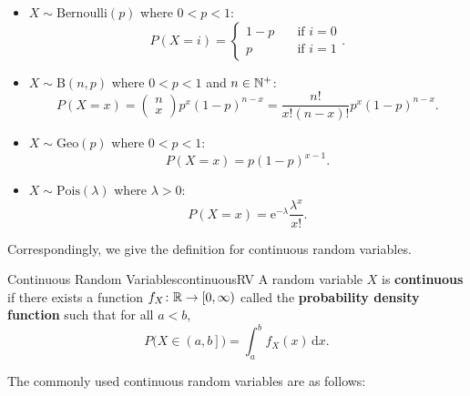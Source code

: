 \documentclass[math, code]{amznotes}
\theoremstyle{remark}
\newcommand{\e}{\mathrm{e}}
\renewcommand{\d}{\mathrm{d}}
\begin{document}
\begin{itemize}
    \item $X \sim \mathrm{Bernoulli}\left(p\right)$ where $0 < p < 1$:
    \begin{equation*}
        P\left(X = i\right) = \begin{cases}
            1 - p & \quad\textrm{if } i = 0 \\
            p & \quad\textrm{if } i = 1
        \end{cases}.
    \end{equation*}
    \item $X \sim \mathrm{B}\left(n, p\right)$ where $0 < p < 1$ and $n \in \mathbb{N}^+$:
    \begin{equation*}
        P\left(X = x\right) = \begin{pmatrix}
            n \\
            x
        \end{pmatrix}p^x\left(1 - p\right)^{n - x} = \frac{n!}{x!\left(n - x\right)!}p^x\left(1 - p\right)^{n - x}.
    \end{equation*}
    \item $X \sim \mathrm{Geo}\left(p\right)$ where $0 < p < 1$:
    \begin{equation*}
        P\left(X = x\right) = p\left(1 - p\right)^{x - 1}.
    \end{equation*}
    \item $X \sim \mathrm{Pois}\left(\lambda\right)$ where $\lambda > 0$:
    \begin{equation*}
        P\left(X = x\right) = \e^{-\lambda}\frac{\lambda^x}{x!}.
    \end{equation*}
\end{itemize}
Correspondingly, we give the definition for continuous random variables.
\begin{dfnbox}{Continuous Random Variables}{continuousRV}
    A random variable $X$ is {\color{red} \textbf{continuous}} if there exists a function $f_X \colon \mathbb{R} \to \left[0, \infty\right)$ called the {\color{red} \textbf{probability density function}} such that for all $a < b$, 
    \begin{equation*}
        P\bigl(X \in \left(a, b\right]\bigr) = \int_{a}^{b}\!f_X\left(x\right)\,\d x.
    \end{equation*}
\end{dfnbox}
The commonly used continuous random variables are as follows:
\end{document}
